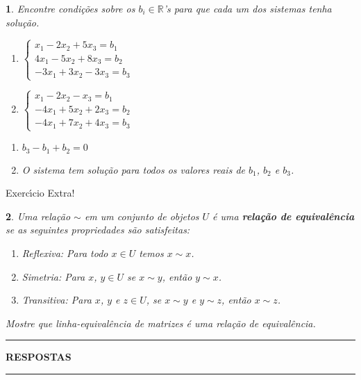 \documentclass[12pt]{exam}
\newtheorem{exercicio}{}
\newcommand{\real}{\mathbb{R}}
\begin{document}
\begin{exercicio}
  Encontre condi\c{c}\~oes sobre os $b_i \in \real$'s para que cada um dos sistemas tenha solu\c{c}\~ao.
  \begin{enumerate}[label={\alph*})]
    \item $\begin{cases}
      x_1 - 2x_2 + 5x_3 = b_1\\
      4x_1 - 5x_2 + 8x_3 = b_2\\
      -3x_1 + 3x_2 - 3x_3 = b_3
    \end{cases}$

    \item $\begin{cases}
      x_1 - 2x_2 - x_3 = b_1\\
      -4x_1 + 5x_2 + 2x_3 = b_2\\
      -4x_1 + 7x_2 + 4x_3 = b_3
    \end{cases}$
  \end{enumerate}
  \begin{solucao}
    \begin{enumerate}[label={\alph*})]
      \item $b_3 - b_1 + b_2 = 0$
      \item O sistema tem solu\c{c}\~ao para todos os valores reais de $b_1$, $b_2$ e $b_3$.
    \end{enumerate}
  \end{solucao}
\end{exercicio}

\begin{center}
  Exerc{\'\i}cio Extra!
\end{center}
\begin{exercicio}
  Uma rela\c{c}\~ao $\sim$ em um conjunto de objetos $U$ \'e uma \textbf{rela\c{c}\~ao de equival\^encia} se as seguintes propriedades s\~ao satisfeitas:
  \begin{enumerate}
    \item \textit{Reflexiva}: Para todo $x \in U$ temos $x \sim x$.
    \item \textit{Simetria}: Para $x$, $y \in U$ se $x \sim y$, ent\~ao $y \sim x$.
    \item \textit{Transitiva}: Para $x$, $y$ e $z \in U$, se $x \sim y$ e $y \sim z$, ent\~ao $x \sim z$.
  \end{enumerate}
  Mostre que linha-equival\^encia de matrizes \'e uma rela\c{c}\~ao de equival\^encia.
\end{exercicio}

\newpage
{}
\hrule
\begin{center}
{\large\bf RESPOSTAS}
\end{center}
\hrule

\end{document}
